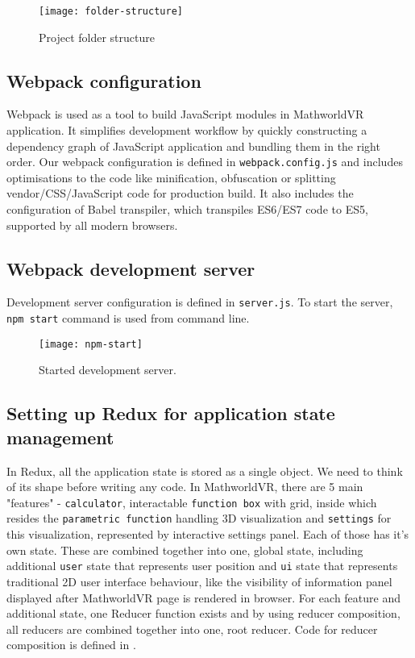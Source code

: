 \begin{figure}[ht!]
\centering
\texttt{[image: folder-structure]}
\caption{Project folder structure}
\label{r:62}
\end{figure}


\subsection{Webpack configuration}
Webpack is used as a tool to build JavaScript modules in MathworldVR application. It simplifies development workflow by quickly constructing a dependency graph of JavaScript application and bundling them in the right order. Our webpack configuration is defined in \texttt{webpack.config.js} and includes optimisations to the code like minification, obfuscation or splitting vendor/CSS/JavaScript code for production build. It also includes the configuration of Babel transpiler, which transpiles ES6/ES7 code to ES5, supported by all modern browsers.

\subsection{Webpack development server}
Development server configuration is defined in \texttt{server.js}. To start the server, \texttt{npm start} command is used from command line.

\begin{figure}[ht!]
\centering
\texttt{[image: npm-start]}
\caption{Started development server.}
\label{r:63}
\end{figure}

\subsection{Setting up Redux for application state management}
In Redux, all the application state is stored as a single object. We need to think of its shape before writing any code. In MathworldVR, there are 5 main "features" -  \texttt{calculator}, interactable \texttt{function box} with grid, inside which resides the \texttt{parametric function} handling 3D visualization and \texttt{settings} for this visualization, represented by interactive settings panel. Each of those has it's own state. These are combined together into one, global state, including additional \texttt{user} state that represents user position and \texttt{ui} state that represents traditional 2D user interface behaviour, like the visibility of information panel displayed after MathworldVR page is rendered in browser. For each feature and additional state, one Reducer function exists and by using reducer composition, all reducers are combined together into one, root reducer. Code for reducer composition is defined in .

